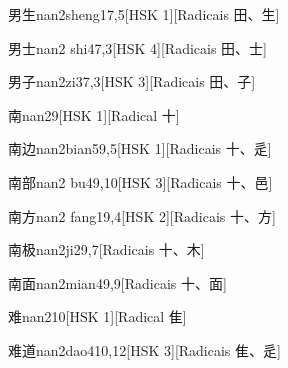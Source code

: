 \begin{entry}{男生}{nan2sheng1}{7,5}[HSK 1][Radicais ⽥、⽣]
\end{entry}

\begin{entry}{男士}{nan2 shi4}{7,3}[HSK 4][Radicais ⽥、⼠]
\end{entry}

\begin{entry}{男子}{nan2zi3}{7,3}[HSK 3][Radicais ⽥、⼦]
\end{entry}

\begin{entry}{南}{nan2}{9}[HSK 1][Radical ⼗]
\end{entry}

\begin{entry}{南边}{nan2bian5}{9,5}[HSK 1][Radicais ⼗、⾡]
\end{entry}

\begin{entry}{南部}{nan2 bu4}{9,10}[HSK 3][Radicais ⼗、⾢]
\end{entry}

\begin{entry}{南方}{nan2 fang1}{9,4}[HSK 2][Radicais ⼗、⽅]
\end{entry}

\begin{entry}{南极}{nan2ji2}{9,7}[Radicais ⼗、⽊]
\end{entry}

\begin{entry}{南面}{nan2mian4}{9,9}[Radicais ⼗、⾯]
\end{entry}

\begin{entry}{难}{nan2}{10}[HSK 1][Radical ⾫]
\end{entry}

\begin{entry}{难道}{nan2dao4}{10,12}[HSK 3][Radicais ⾫、⾡]
\end{entry}

